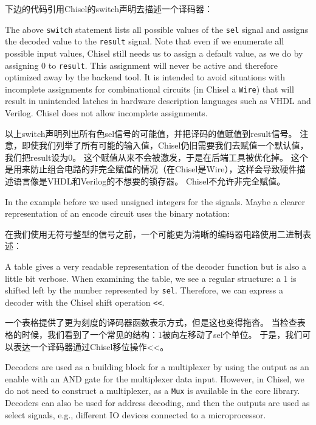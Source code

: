 \documentclass[%
    10pt,
    headinclude, footexclude,
    openright, %
    notitlepage,
    cleardoubleempty,
    headsepline,
    pointlessnumbers,
    bibtotoc, idxtotoc,
    ]{scrbook}
\newcommand{\code}[1]{{\small{\texttt{#1}}}}
\newcommand{\todo}[1]{{\emph{TODO: #1}}}
\renewcommand{\todo}[1]{}
\begin{document}
下边的代码引用Chisel的switch声明去描述一个译码器：


\noindent The above \code{switch} statement lists all possible values of the \code{sel} signal
and assigns the decoded value to the \code{result} signal.
Note that even if we enumerate all possible input values, Chisel still needs us to assign a
default value, as we do by assigning 0 to \code{result}.
This assignment will never be active and therefore optimized away by the backend tool.
It is intended to avoid situations with incomplete assignments for combinational circuits
(in Chisel a \code{Wire}) that will result in unintended latches in hardware description
languages such as VHDL and Verilog. Chisel does not allow incomplete assignments.

以上switch声明列出所有色sel信号的可能值，并把译码的值赋值到result信号。
注意，即使我们列举了所有可能的输入值，Chisel仍旧需要我们去赋值一个默认值，我们把result设为0。
这个赋值从来不会被激发，于是在后端工具被优化掉。
这个是用来防止组合电路的非完全赋值的情况（在Chisel是Wire），这样会导致硬件描述语言像是VHDL和Verilog的不想要的锁存器。
Chisel不允许非完全赋值。

In the example before we used unsigned integers for the signals. Maybe a clearer representation
of an encode circuit uses the binary notation:

在我们使用无符号整型的信号之前，一个可能更为清晰的编码器电路使用二进制表述：


\todo{from Luca: for very small examples. What if the one-hot input is 256 wires? Can Chisel capture that? Or I need 256 lines? I would suggest to put an additional example. Maybe there is something like the for loop in VHDL.}

A table gives a very readable representation of the decoder function but is also
a little bit verbose.
When examining the table, we see a regular structure: a 1 is shifted left by the number
represented by \code{sel}. Therefore, we can express a decoder with the Chisel shift
operation \code{<<}.

一个表格提供了更为刻度的译码器函数表示方式，但是这也变得拖沓。
当检查表格的时候，我们看到了一个常见的结构：1被向左移动了sel个单位。
于是，我们可以表达一个译码器通过Chisel移位操作<<。


Decoders are used as a building block for a multiplexer by using the output as an enable
with an AND gate for the multiplexer data input. However, in Chisel, we do not need to construct
a multiplexer, as a \code{Mux} is available in the core library.
Decoders can also be used for address decoding, and then the outputs are used as
select signals, e.g., different IO devices connected to a microprocessor. 
\end{document}
